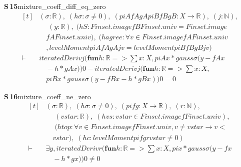 \documentclass[conference]{IEEEtran}
\theoremstyle{definition}
\newcommand{\lean}[1]{\textsf{\footnotesize #1}}
\begin{document}
\noindent\textbf{S\,15}\quad\lean{mixture\_coeff\_diff\_eq\_zero}
{\footnotesize\[ \begin{aligned}[t]
&(\sigma : \mathbb{R} ),\; (\mathit{hσ} : \sigma \neq 0),\; (\mathit{piA} \mathit{fA} \mathit{gA} \mathit{piB} \mathit{fB} \mathit{gB} : \mathit{X} \to \mathbb{R} ),\; (\mathit{j} : \mathbb{N} ),\\
&\quad \; (\mathit{y} : \mathbb{R} ),\; (\mathit{hS} : \mathit{Finset}.\mathit{image} \mathit{fB} \mathit{Finset}.\mathit{univ} = \mathit{Finset}.\mathit{image}\\
&\quad \mathit{fA} \mathit{Finset}.\mathit{univ}),\; (\mathit{hagree} : \forall \mathit{v} \in \mathit{Finset}.\mathit{image} \mathit{fA} \mathit{Finset}.\mathit{univ}\\
&\quad , \mathit{levelMoment} \mathit{piA} \mathit{fA} \mathit{gA} \mathit{j} \mathit{v} = \mathit{levelMoment} \mathit{piB} \mathit{fB} \mathit{gB} \mathit{j} \mathit{v})\\
\vdash\;&\mathit{iteratedDeriv} \mathit{j} (\mathbf{fun} \mathit{h} : \mathbb{R} => \textstyle\sum \mathit{x} : \mathit{X}, \mathit{piA} \mathit{x} * \mathit{gauss} \sigma (\mathit{y} - \mathit{fA} \mathit{x}\\
&\quad - \mathit{h} * \mathit{gA} \mathit{x})) 0 - \mathit{iteratedDeriv} \mathit{j} (\mathbf{fun} \mathit{h} : \mathbb{R} => \textstyle\sum \mathit{x} : \mathit{X},\\
&\quad \mathit{piB} \mathit{x} * \mathit{gauss} \sigma (\mathit{y} - \mathit{fB} \mathit{x} - \mathit{h} * \mathit{gB} \mathit{x})) 0 = 0
\end{aligned} \]}

\noindent\textbf{S\,16}\quad\lean{mixture\_coeff\_ne\_zero}
{\footnotesize\[ \begin{aligned}[t]
&(\sigma : \mathbb{R} ),\; (\mathit{hσ} : \sigma \neq 0),\; (\mathit{pi} \mathit{f} \mathit{g} : \mathit{X} \to \mathbb{R} ),\; (\mathit{r} : \mathbb{N} ),\\
&\quad \; (\mathit{vstar} : \mathbb{R} ),\; (\mathit{hvs} : \mathit{vstar} \in \mathit{Finset}.\mathit{image} \mathit{f} \mathit{Finset}.\mathit{univ}),\\
&\quad \; (\mathit{htop} : \forall \mathit{v} \in \mathit{Finset}.\mathit{image} \mathit{f} \mathit{Finset}.\mathit{univ}, \mathit{v} \neq \mathit{vstar} \to \mathit{v} <\\
&\quad \mathit{vstar}),\; (\mathit{hc} : \mathit{levelMoment} \mathit{pi} \mathit{f} \mathit{g} \mathit{r} \mathit{vstar} \neq 0)\\
\vdash\;&\exists \mathit{y}, \mathit{iteratedDeriv} \mathit{r} (\mathbf{fun} \mathit{h} : \mathbb{R} => \textstyle\sum \mathit{x} : \mathit{X}, \mathit{pi} \mathit{x} * \mathit{gauss} \sigma (\mathit{y} - \mathit{f} \mathit{x}\\
&\quad - \mathit{h} * \mathit{g} \mathit{x})) 0 \neq 0
\end{aligned} \]}
\end{document}
